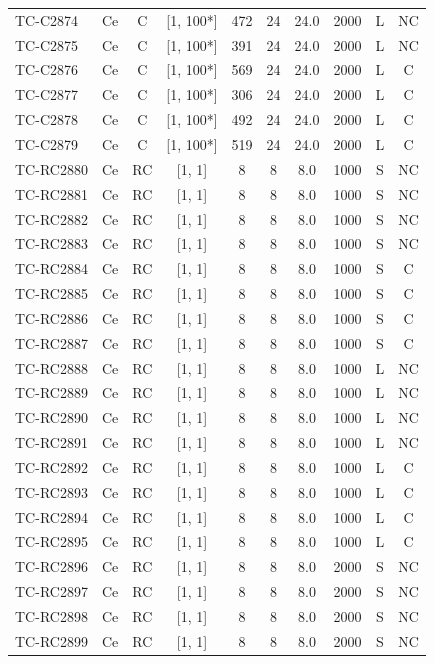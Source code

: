 \begin{longtable}{lccccccccc}
TC-C2874 & Ce & C & [1, 100*] & 472 & 24 & 24.0 & 2000 & L & NC \\
TC-C2875 & Ce & C & [1, 100*] & 391 & 24 & 24.0 & 2000 & L & NC \\
TC-C2876 & Ce & C & [1, 100*] & 569 & 24 & 24.0 & 2000 & L & C \\
TC-C2877 & Ce & C & [1, 100*] & 306 & 24 & 24.0 & 2000 & L & C \\
TC-C2878 & Ce & C & [1, 100*] & 492 & 24 & 24.0 & 2000 & L & C \\
TC-C2879 & Ce & C & [1, 100*] & 519 & 24 & 24.0 & 2000 & L & C \\
TC-RC2880 & Ce & RC & [1, 1] & 8 & 8 & 8.0 & 1000 & S & NC \\
TC-RC2881 & Ce & RC & [1, 1] & 8 & 8 & 8.0 & 1000 & S & NC \\
TC-RC2882 & Ce & RC & [1, 1] & 8 & 8 & 8.0 & 1000 & S & NC \\
TC-RC2883 & Ce & RC & [1, 1] & 8 & 8 & 8.0 & 1000 & S & NC \\
TC-RC2884 & Ce & RC & [1, 1] & 8 & 8 & 8.0 & 1000 & S & C \\
TC-RC2885 & Ce & RC & [1, 1] & 8 & 8 & 8.0 & 1000 & S & C \\
TC-RC2886 & Ce & RC & [1, 1] & 8 & 8 & 8.0 & 1000 & S & C \\
TC-RC2887 & Ce & RC & [1, 1] & 8 & 8 & 8.0 & 1000 & S & C \\
TC-RC2888 & Ce & RC & [1, 1] & 8 & 8 & 8.0 & 1000 & L & NC \\
TC-RC2889 & Ce & RC & [1, 1] & 8 & 8 & 8.0 & 1000 & L & NC \\
TC-RC2890 & Ce & RC & [1, 1] & 8 & 8 & 8.0 & 1000 & L & NC \\
TC-RC2891 & Ce & RC & [1, 1] & 8 & 8 & 8.0 & 1000 & L & NC \\
TC-RC2892 & Ce & RC & [1, 1] & 8 & 8 & 8.0 & 1000 & L & C \\
TC-RC2893 & Ce & RC & [1, 1] & 8 & 8 & 8.0 & 1000 & L & C \\
TC-RC2894 & Ce & RC & [1, 1] & 8 & 8 & 8.0 & 1000 & L & C \\
TC-RC2895 & Ce & RC & [1, 1] & 8 & 8 & 8.0 & 1000 & L & C \\
TC-RC2896 & Ce & RC & [1, 1] & 8 & 8 & 8.0 & 2000 & S & NC \\
TC-RC2897 & Ce & RC & [1, 1] & 8 & 8 & 8.0 & 2000 & S & NC \\
TC-RC2898 & Ce & RC & [1, 1] & 8 & 8 & 8.0 & 2000 & S & NC \\
TC-RC2899 & Ce & RC & [1, 1] & 8 & 8 & 8.0 & 2000 & S & NC \\

\end{longtable}

